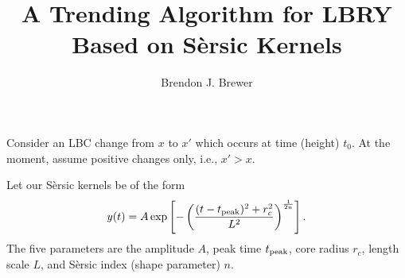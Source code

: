 \documentclass[a4paper, 12pt]{article}
\title{A Trending Algorithm for LBRY Based on Sèrsic Kernels}
\author{Brendon J. Brewer}
\date{}
\begin{document}
\maketitle


\setlength{\parindent}{0pt}
\setlength{\parskip}{8pt}

Consider an LBC change from $x$ to $x'$ which occurs at time (height) $t_0$.
At the moment, assume positive changes only, i.e., $x' > x$.


Let our Sèrsic kernels be of the form
\begin{align}
y(t) = A \exp\left[-\left(\frac{(t - t_{\rm peak})^2 + r_c^2}{L^2}\right)
                        ^{\frac{1}{2n}}\right].
\end{align}
The five parameters are the amplitude $A$, peak time $t_{\rm peak}$,
core radius $r_c$, length scale $L$, and Sèrsic index (shape parameter) $n$.
\end{document}
